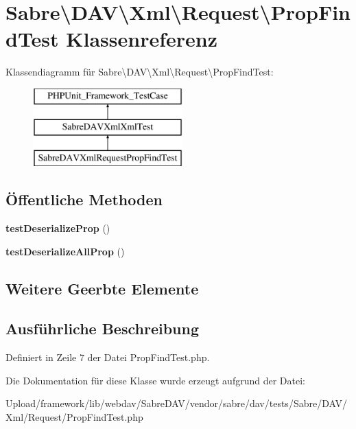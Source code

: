 \hypertarget{class_sabre_1_1_d_a_v_1_1_xml_1_1_request_1_1_prop_find_test}{}\section{Sabre\textbackslash{}D\+AV\textbackslash{}Xml\textbackslash{}Request\textbackslash{}Prop\+Find\+Test Klassenreferenz}
\label{class_sabre_1_1_d_a_v_1_1_xml_1_1_request_1_1_prop_find_test}
Klassendiagramm für Sabre\textbackslash{}D\+AV\textbackslash{}Xml\textbackslash{}Request\textbackslash{}Prop\+Find\+Test\+:\begin{figure}[H]
\begin{center}
\leavevmode
\includegraphics[height=3.000000cm]{class_sabre_1_1_d_a_v_1_1_xml_1_1_request_1_1_prop_find_test}
\end{center}
\end{figure}
\subsection*{Öffentliche Methoden}
\begin{DoxyCompactItemize}
\item 
\mbox{\label{class_sabre_1_1_d_a_v_1_1_xml_1_1_request_1_1_prop_find_test_abe277144f8b0f4f14bdebd7592d34ce8}} 
{\bfseries test\+Deserialize\+Prop} ()
\item 
\mbox{\label{class_sabre_1_1_d_a_v_1_1_xml_1_1_request_1_1_prop_find_test_af655cb382b61bc7665abd88be1d9a15e}} 
{\bfseries test\+Deserialize\+All\+Prop} ()
\end{DoxyCompactItemize}
\subsection*{Weitere Geerbte Elemente}


\subsection{Ausführliche Beschreibung}


Definiert in Zeile 7 der Datei Prop\+Find\+Test.\+php.



Die Dokumentation für diese Klasse wurde erzeugt aufgrund der Datei\+:\begin{DoxyCompactItemize}
\item 
Upload/framework/lib/webdav/\+Sabre\+D\+A\+V/vendor/sabre/dav/tests/\+Sabre/\+D\+A\+V/\+Xml/\+Request/Prop\+Find\+Test.\+php\end{DoxyCompactItemize}
